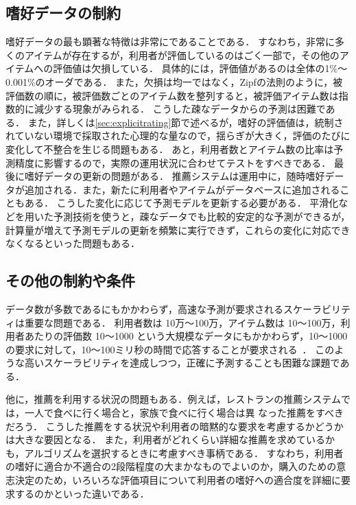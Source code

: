 \subsection{嗜好データの制約}

嗜好データの最も顕著な特徴は非常にであることである．
すなわち，非常に多くのアイテムが存在するが，利用者が評価しているのはごく一部で，その他のアイテムへの評価値は欠損している．
具体的には，評価値があるのは全体の1\%〜0.001\%のオーダである\cite{dmkd:01:01}．
また，欠損は均一ではなく，Zipfの法則\cite{jb:012:00}のように，被評価数の順に，被評価数ごとのアイテム数を整列すると，被評価アイテム数は指数的に減少する現象がみられる\cite{misc:007}．
こうした疎なデータからの予測は困難である．
また，詳しくは\ref{sec:explicitrating}節で述べるが，嗜好の評価値は，統制されていない環境で採取された心理的な量なので，揺らぎが大きく，評価のたびに変化して不整合を生じる問題もある．
あと，利用者数とアイテム数の比率は予測精度に影響する\cite{jacm:04:01}ので，実際の運用状況に合わせてテストをすべきである．
最後に嗜好データの更新の問題がある．
推薦システムは運用中に，随時嗜好データが追加される．また，新たに利用者やアイテムがデータベースに追加されることもある．
こうした変化に応じて予測モデルを更新する必要がある．
平滑化などを用いた予測技術を使うと，疎なデータでも比較的安定的な予測ができるが，計算量が増えて予測モデルの更新を頻繁に実行できず，これらの変化に対応できなくなるといった問題もある．

\subsection{その他の制約や条件}

データ数が多数であるにもかかわらず，高速な予測が要求されるスケーラビリティは重要な問題である．
利用者数は 10万〜100万，アイテム数は 10〜100万，利用者あたりの評価数 10〜1000 という大規模なデータにもかかわらず，10〜1000の要求に対して，10〜100ミリ秒の時間で応答することが要求される~\cite{dmkd:01:01,ieeem:03:01}．
このような高いスケーラビリティを達成しつつ，正確に予測することも困難な課題である．

他に，推薦を利用する状況の問題もある．例えば，レストランの推薦システムでは，一人で食べに行く場合と，家族で食べに行く場合は異
なった推薦をすべきだろう．
こうした推薦をする状況や利用者の暗黙的な要求を考慮するかどうかは大きな要因となる．
また，利用者がどれくらい詳細な推薦を求めているかも，アルゴリズムを選択するときに考慮すべき事柄である．
すなわち，利用者の嗜好に適合か不適合の2段階程度の大まかなものでよいのか，購入のための意志決定のため，いろいろな評価項目について利用者の嗜好への適合度を詳細に要求するのかといった違いである．
